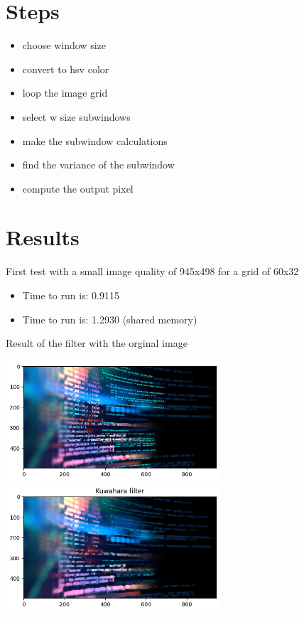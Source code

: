 \documentclass{article}
\begin{document}
\section{Steps}

\begin{itemize}
    \item choose window size
    \item convert to hsv color
    \item loop the image grid
    \item select w size subwindows
    \item make the subwindow calculations
    \item find the variance of the subwindow
    \item compute the output pixel
\end{itemize}

\section{Results}

First test with a small image quality of 945x498 for a grid of 60x32
\begin{itemize}
    \item Time to run is: 0.9115
    \item Time to run is: 1.2930 (shared memory)
\end{itemize}

Result of the filter with the orginal image


\includegraphics[width=0.6\textwidth]{code_plt.png}
\includegraphics[width=0.6\textwidth]{code_plt_kuwahara.png}
\end{document}

